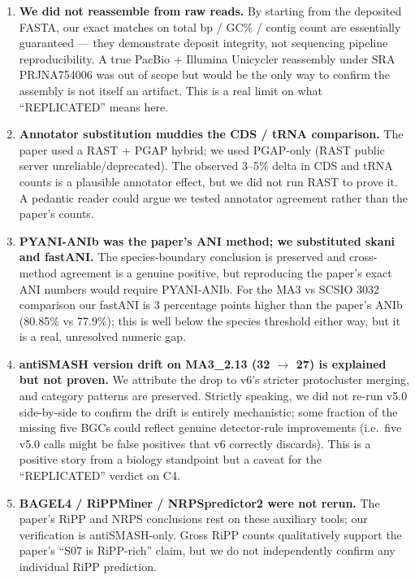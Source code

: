 \documentclass[11pt,letterpaper]{article}
\begin{document}
\begin{enumerate}[leftmargin=1.5em]
\item \textbf{We did not reassemble from raw reads.} By starting from the deposited FASTA, our exact matches on total bp / GC\% / contig count are essentially guaranteed --- they demonstrate deposit integrity, not sequencing pipeline reproducibility. A true PacBio + Illumina Unicycler reassembly under SRA PRJNA754006 was out of scope but would be the only way to confirm the assembly is not itself an artifact. This is a real limit on what ``REPLICATED'' means here.

\item \textbf{Annotator substitution muddies the CDS / tRNA comparison.} The paper used a RAST + PGAP hybrid; we used PGAP-only (RAST public server unreliable/deprecated). The observed 3--5\% delta in CDS and tRNA counts is a plausible annotator effect, but we did not run RAST to prove it. A pedantic reader could argue we tested annotator agreement rather than the paper's counts.

\item \textbf{PYANI-ANIb was the paper's ANI method; we substituted skani and fastANI.} The species-boundary conclusion is preserved and cross-method agreement is a genuine positive, but reproducing the paper's exact ANI numbers would require PYANI-ANIb. For the MA3 vs SCSIO 3032 comparison our fastANI is 3 percentage points higher than the paper's ANIb (80.85\% vs 77.9\%); this is well below the species threshold either way, but it is a real, unresolved numeric gap.

\item \textbf{antiSMASH version drift on MA3\_2.13 (32 $\rightarrow$ 27) is explained but not proven.} We attribute the drop to v6's stricter protocluster merging, and category patterns are preserved. Strictly speaking, we did not re-run v5.0 side-by-side to confirm the drift is entirely mechanistic; some fraction of the missing five BGCs could reflect genuine detector-rule improvements (i.e.\ five v5.0 calls might be false positives that v6 correctly discards). This is a positive story from a biology standpoint but a caveat for the ``REPLICATED'' verdict on C4.

\item \textbf{BAGEL4 / RiPPMiner / NRPSpredictor2 were not rerun.} The paper's RiPP and NRPS conclusions rest on these auxiliary tools; our verification is antiSMASH-only. Gross RiPP counts qualitatively support the paper's ``S07 is RiPP-rich'' claim, but we do not independently confirm any individual RiPP prediction.


\end{enumerate}
\end{document}
